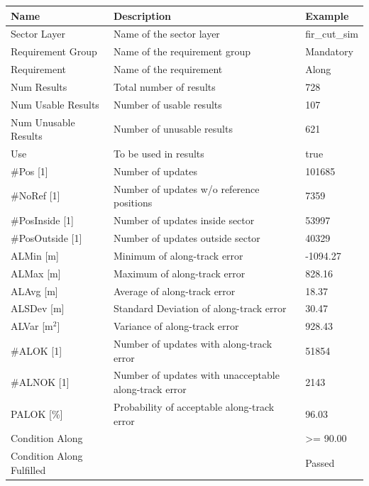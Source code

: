 \begin{center}
 \begin{table}[H]
  \begin{tabularx}{\textwidth}{ | l | X |  l | }
    \hline
    \textbf{Name} & \textbf{Description} & \textbf{Example} \\ \hline
    Sector Layer & Name of the sector layer & fir\_cut\_sim \\ \hline
    Requirement Group & Name of the requirement group & Mandatory \\ \hline
    Requirement & Name of the requirement & Along \\ \hline
    Num Results & Total number of results & 728 \\ \hline
    Num Usable Results & Number of usable results & 107 \\ \hline
    Num Unusable Results & Number of unusable results & 621 \\ \hline
    Use & To be used in results & true \\ \hline
    \#Pos [1] & Number of updates & 101685 \\ \hline
    \#NoRef [1] & Number of updates w/o reference positions & 7359 \\ \hline
    \#PosInside [1] & Number of updates inside sector & 53997 \\ \hline
    \#PosOutside [1] & Number of updates outside sector & 40329 \\ \hline
    ALMin [m] & Minimum of along-track error & -1094.27 \\ \hline
    ALMax [m] & Maximum of along-track error & 828.16 \\ \hline
    ALAvg [m] & Average of along-track error & 18.37 \\ \hline
    ALSDev [m] & Standard Deviation of along-track error & 30.47 \\ \hline
    ALVar [m$^2$] & Variance of along-track error & 928.43 \\ \hline
    \#ALOK [1] & Number of updates with along-track error & 51854 \\ \hline
    \#ALNOK [1] & Number of updates with unacceptable along-track error  & 2143 \\ \hline
    PALOK [\%] & Probability of acceptable along-track error & 96.03 \\ \hline
    Condition Along &  & >= 90.00 \\ \hline
    Condition Along Fulfilled &  & Passed \\ \hline
\end{tabularx}
\end{table}
\end{center}

